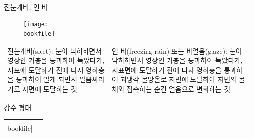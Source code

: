 \begin{frame}[t]{진눈개비, 언 비}
	\begin{figure}[t]
		\texttt{[image: \\bookfile]}
	\end{figure}
	\begin{tabular}{ll}
		\begin{minipage}[t]{0.475\textwidth} \scriptsize
			진눈개비(sleet): 눈이 낙하하면서 영상인 기층을 통과하여 녹았다가, 지표에 도달하기 전에 다시 영하층을 통과하여 얼게 되면서 얼음싸라기로 지면에 도달하는 것
		\end{minipage}	
		&
		\begin{minipage}[t]{0.475\textwidth} \scriptsize	
			언 비(freezing rain) 또는 비얼음(glaze): 눈이 낙하하면서 영상인 기층을 통과하여 녹았다가, 지표면에 도달하기 전에 다시 영하층을 통과하여 과냉각 물방울로 지면에 도달하여 지면의 물체와 접촉하는 순간 얼음으로 변화하는 것
		\end{minipage}
		
	\end{tabular}
\end{frame}



\begin{frame}[t]{강수 형태}
	\begin{tabular}{ll}
		\begin{minipage}[t]{0.9\textwidth} \scriptsize
			\begin{figure}[t]
				\texttt{[image: \\bookfile]}
			\end{figure}
		\end{minipage}	
		&
		\begin{minipage}[t]{0.05\textwidth} \scriptsize	

		\end{minipage}
		
	\end{tabular}
\end{frame}





